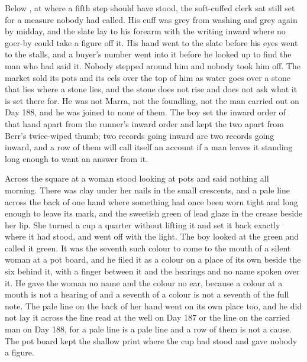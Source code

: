 Below , at  where a fifth step should have stood, the soft-cuffed clerk sat still set for a measure nobody had called. His cuff was grey from washing and grey again by midday, and the slate lay to his forearm with the writing inward where no goer-by could take a figure off it. His hand went to the slate before his eyes went to the stalls, and a buyer's number went into it before he looked up to find the man who had said it. Nobody stepped around him and nobody took him off. The market sold its pots and its eels over the top of him as water goes over a stone that lies where a stone lies, and the stone does not rise and does not ask what it is set there for. He was not Marra, not the foundling, not the man carried out on Day 188, and he was joined to none of them. The boy set the inward order of that hand apart from the runner's inward order and kept the two apart from Berr's twice-wiped thumb; two records going inward are two records going inward, and a row of them will call itself an account if a man leaves it standing long enough to want an answer from it.

Across the square at  a woman stood looking at pots and said nothing all morning. There was clay under her nails in the small crescents, and a pale line across the back of one hand where something had once been worn tight and long enough to leave its mark, and the sweetish green of lead glaze in the crease beside her lip. She turned a cup a quarter without lifting it and set it back exactly where it had stood, and went off with the light. The boy looked at the green and called it green. It was the seventh such colour to come to the mouth of a silent woman at a pot board, and he filed it as a colour on a place of its own beside the six behind it, with a finger between it and the hearings and no name spoken over it. He gave the woman no name and the colour no ear, because a colour at a mouth is not a hearing of  and a seventh of a colour is not a seventh of the full note. The pale line on the back of her hand went on its own place too, and he did not lay it across the line read at the well on Day 187 or the line on the carried man on Day 188, for a pale line is a pale line and a row of them is not a cause. The pot board kept the shallow print where the cup had stood and gave nobody a figure.


